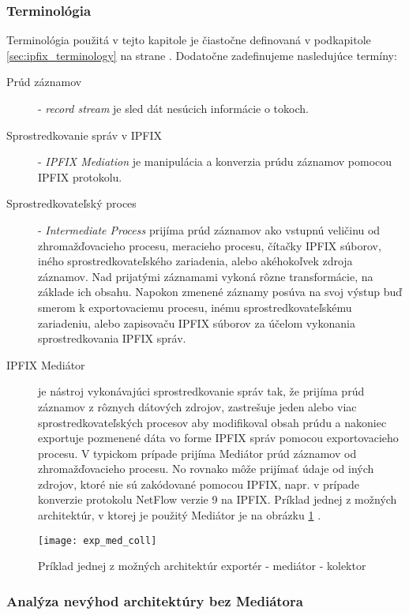 \subsubsection{Terminológia}
Terminológia použitá v tejto kapitole je čiastočne definovaná v podkapitole \ref{sec:ipfix_terminology} 
na strane \pageref{sec:ipfix_terminology}. 
Dodatočne zadefinujeme nasledujúce termíny:
\begin{description}
 \item[Prúd záznamov] - \emph{record stream} je sled dát nesúcich informácie o tokoch.
 
 \item[Sprostredkovanie správ v IPFIX] - \emph{IPFIX Mediation} je manipulácia a konverzia prúdu záznamov
 pomocou IPFIX protokolu.
 
 \item[Sprostredkovateľský proces] - \emph{Intermediate Process} prijíma prúd záznamov ako vstupnú 
 veličinu od zhromažďovacieho procesu, meracieho procesu, čítačky IPFIX súborov, iného 
 sprostredkovateľského zariadenia, alebo akéhokoľvek zdroja záznamov. Nad prijatými záznamami
 vykoná rôzne transformácie, na základe ich obsahu. Napokon zmenené záznamy posúva na svoj výstup buď
 smerom k exportovaciemu procesu, inému sprostredkovateľskému zariadeniu, alebo zapisovaču IPFIX súborov
 za účelom vykonania sprostredkovania IPFIX správ.
 
 \item[IPFIX Mediátor] je nástroj vykonávajúci sprostredkovanie správ tak, že prijíma prúd záznamov 
 z rôznych dátových zdrojov, zastrešuje jeden alebo viac sprostredkovateľských procesov  
 aby modifikoval obsah prúdu a nakoniec exportuje pozmenené dáta vo forme IPFIX správ pomocou exportovacieho
 procesu. V typickom prípade prijíma Mediátor prúd záznamov od zhromažďovacieho procesu. No rovnako môže
 prijímať údaje od iných zdrojov, ktoré nie sú zakódované pomocou IPFIX, napr. v prípade konverzie 
 protokolu NetFlow verzie 9 \citep{rfc3954} na IPFIX. Príklad jednej z možných architektúr, 
 v ktorej je použitý Mediátor je na obrázku \ref{o:exp_med_coll} \citep{rfc5982}.
\end{description}

\begin{figure}[ht!]
\centering
\texttt{[image: exp\_med\_coll]}
\caption{Príklad jednej z možných architektúr exportér - mediátor - kolektor}\label{o:exp_med_coll}
\end{figure}


\subsubsection{Anal\'yza nev\'yhod architekt\'ury bez Medi\'atora}


